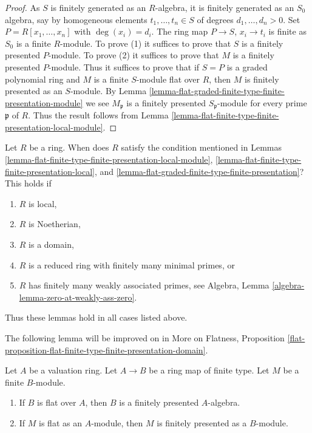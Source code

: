 \begin{proof}
As $S$ is finitely generated as an $R$-algebra, it is finitely generated
as an $S_0$ algebra, say by homogeneous elements $t_1, \ldots, t_n \in S$
of degrees $d_1, \ldots, d_n > 0$. Set $P = R[x_1, \ldots, x_n]$ with
$\deg(x_i) = d_i$. The ring map $P \to S$, $x_i \to t_i$ is finite
as $S_0$ is a finite $R$-module. To prove (1) it suffices to prove
that $S$ is a finitely presented $P$-module.  To prove (2) it suffices
to prove that $M$ is a finitely presented $P$-module. Thus it suffices
to prove that if $S = P$ is a graded polynomial ring and $M$ is a finite
$S$-module flat over $R$, then $M$ is finitely presented as an $S$-module. By
Lemma \ref{lemma-flat-graded-finite-type-finite-presentation-module}
we see $M_{\mathfrak p}$ is a finitely presented $S_{\mathfrak p}$-module
for every prime $\mathfrak p$ of $R$. Thus the result follows from
Lemma \ref{lemma-flat-finite-type-finite-presentation-local-module}.
\end{proof}

\begin{remark}
\label{remark-when-does-condition-hold}
Let $R$ be a ring. When does $R$ satisfy the condition mentioned in
Lemmas \ref{lemma-flat-finite-type-finite-presentation-local-module},
\ref{lemma-flat-finite-type-finite-presentation-local}, and
\ref{lemma-flat-graded-finite-type-finite-presentation}?
This holds if
\begin{enumerate}
\item $R$ is local,
\item $R$ is Noetherian,
\item $R$ is a domain,
\item $R$ is a reduced ring with finitely many minimal primes, or
\item $R$ has finitely many weakly associated primes, see
Algebra, Lemma \ref{algebra-lemma-zero-at-weakly-ass-zero}.
\end{enumerate}
Thus these lemmas hold in all cases listed above.
\end{remark}

\noindent
The following lemma will be improved on in
More on Flatness, Proposition
\ref{flat-proposition-flat-finite-type-finite-presentation-domain}.

\begin{lemma}
\label{lemma-flat-finite-type-valuation-ring-finite-presentation}
\begin{reference}
\cite[Theorem 3]{Nagata-Finitely}
\end{reference}
Let $A$ be a valuation ring. Let $A \to B$ be a ring map of finite type.
Let $M$ be a finite $B$-module.
\begin{enumerate}
\item If $B$ is flat over $A$, then $B$ is a finitely presented $A$-algebra.
\item If $M$ is flat as an $A$-module, then $M$ is finitely presented
as a $B$-module.
\end{enumerate}
\end{lemma}

